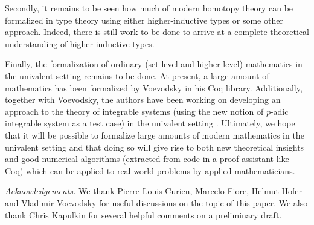 \documentclass{amsart}
\theoremstyle{definition}
\theoremstyle{remark}
\numberwithin{equation}{section}
\begin{document}
Secondly, it remains to be seen how much of modern homotopy theory can
be formalized in type theory using either higher-inductive types or
some other approach.  Indeed, there is still work to be done to arrive
at a complete theoretical understanding of higher-inductive types.

Finally, the formalization of ordinary (set level and higher-level)
mathematics in the univalent setting remains to be done.  At present,
a large amount of mathematics has been formalized by Voevodsky in his
Coq library.  Additionally, together with Voevodsky, the authors have
been working on developing an approach to the theory of integrable
systems (using the new notion of $p$-adic integrable system as a test
case) in the univalent setting \cite{PeVoWa2012}.  Ultimately, we hope that it
will be possible to formalize large amounts of modern mathematics in
the univalent setting and that doing so will give rise to both new
theoretical insights and good numerical algorithms (extracted from code in
a proof assistant like Coq) which can be applied to real world
problems by applied mathematicians.











\emph{Acknowledgements.} We thank Pierre-Louis Curien, Marcelo Fiore, Helmut Hofer and Vladimir
Voevodsky for useful discussions on the topic of this paper.  We
also thank Chris Kapulkin for several helpful comments on a
preliminary draft.



\end{document}

